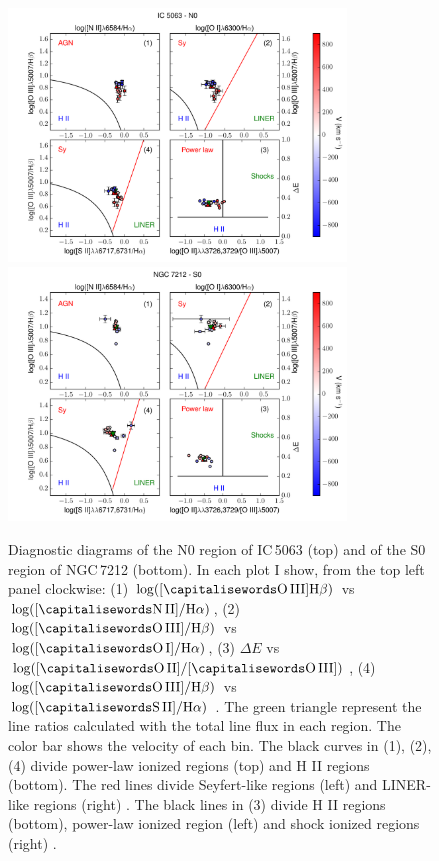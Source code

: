 \documentclass[../main.tex]{subfiles}
\begin{document}
\begin{figure} 
\centering
\includegraphics[width=0.8\textwidth]{images/paper1/IC5063_n0_diag.pdf}\\
\includegraphics[width=0.8\textwidth]{images/paper1/NGC7212_s0_diag.pdf}\\
\caption[]{Diagnostic diagrams of the N0 region of IC\,5063 (top) and of the S0 region of NGC\,7212 (bottom).  In each plot I show, from the top left panel clockwise: (1) $\log([\rm\ion{O}{III}] \Hb)$ vs $\log([\rm\ion{N}{II}]/ \Ha)$, (2) $\log([\rm\ion{O}{III}]/ \Hb)$ vs $\log([\rm\ion{O}{I}]/ \Ha)$, (3) $\Delta E$ vs $\log([\rm\ion{O}{II}]/[\rm\ion{O}{III}])$, (4) $\log([\rm\ion{O}{III}]/ \Hb)$ vs $\log([\rm\ion{S}{II}]/ \Ha)$ \citep{Baldwin81, Veilleux87}. The green triangle represent the line ratios calculated with the total line flux in each region. The color bar shows the velocity of each bin. The black curves in (1), (2), (4) divide power-law ionized regions (top) and H II regions (bottom). The red lines divide Seyfert-like regions (left) and LINER-like regions (right) \citep{Kewley06}. The black lines in (3) divide H II regions (bottom), power-law ionized region (left) and shock ionized regions (right) \citep{Baldwin81}.}
\label{fig:diag_es}
\end{figure}
\end{document}
